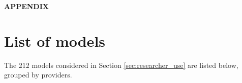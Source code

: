\documentclass[11pt]{article}
\begin{document}


\renewcommand{\em}{\bfseries}

\nocite{ollion2024,palmer2024}
\clearpage
\appendix

\setcounter{figure}{0}
\renewcommand{\thefigure}{A\arabic{figure}}
\renewcommand{\theHfigure}{appendix.\arabic{figure}}
\begin{center} \Large
\textbf{APPENDIX}   
\end{center}

\section{List of models}
\label{sec:model_list}

The 212 models considered in Section \ref{sec:researcher_use} are listed below, grouped by providers.
\end{document}
